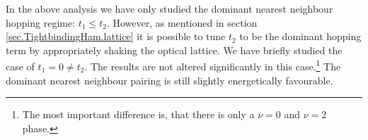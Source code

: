 In the above analysis we have only studied the dominant nearest neighbour hopping regime: $t_1 \leq t_2$. However, as mentioned in section \ref{sec.TightbindingHam.lattice} it is possible to tune $t_2$ to be the dominant hopping term by appropriately shaking the optical lattice. We have briefly studied the case of $t_1 = 0 \neq t_2$. The results are not altered significantly in this case.\footnote{The most important difference is, that there is only a $\nu = 0$ and $\nu = 2$ phase.} The dominant nearest neighbour pairing is still slightly energetically favourable.

